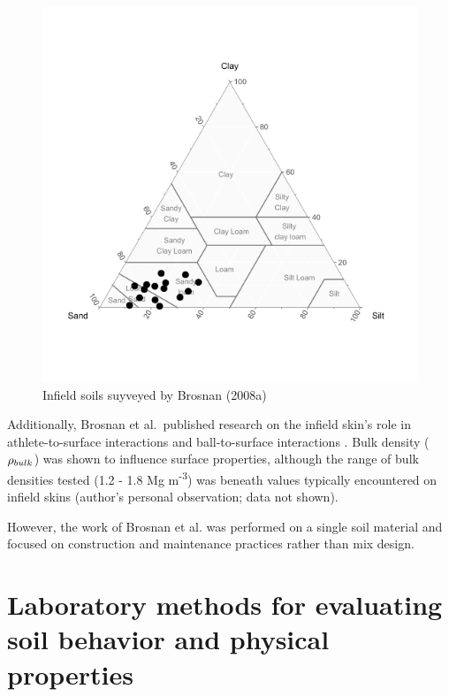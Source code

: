 \documentclass[
]{book}
\begin{document}
\begin{figure}

{\centering \includegraphics[width=7.5in]{figs/brosnan_survey_PSA} 

}

\caption{Infield soils suyveyed by Brosnan (2008a)}\label{fig:brosnan-survey-usda}
\end{figure}

Additionally, Brosnan et al.~published research on the infield skin's role in athlete-to-surface interactions \citeyearpar{Brosnan2009} and ball-to-surface interactions \citeyearpar{Brosnan2011}. Bulk density (\(\Large{\rho}\small{_{bulk}}\)) was shown to influence surface properties, although the range of bulk densities tested (1.2 - 1.8 Mg m\textsuperscript{-3}) was beneath values typically encountered on infield skins (author's personal observation; data not shown).

However, the work of Brosnan et al. \citetext{\citeyear{Brosnan2009}; \citeyear{Brosnan2011}} was performed on a single soil material and focused on construction and maintenance practices rather than mix design.

\hypertarget{laboratory-methods-for-evaluating-soil-behavior-and-physical-properties}{%
\section{Laboratory methods for evaluating soil behavior and physical properties}\label{laboratory-methods-for-evaluating-soil-behavior-and-physical-properties}}
\end{document}
